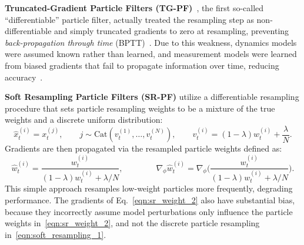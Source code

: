         \textbf{Truncated-Gradient Particle Filters (TG-PF)}~\cite{jonschkowski18_differentiable_particle_filter}, the first so-called ``differentiable'' particle filter, actually treated the resampling step as non-differentiable and simply truncated gradients to zero at resampling, preventing \emph{back-propagation through time} (BPTT)~\cite{werbos1990backpropagation}. Due to this weakness, dynamics models were assumed known rather than learned, and measurement models were learned from biased gradients that fail to propagate information over time, reducing accuracy~\cite{younis2023mdpf}.

        \textbf{Soft Resampling Particle Filters (SR-PF)} \cite{pmlr-v87-karkus18a_soft_resampling} utilize a differentiable resampling procedure that sets particle resampling weights to be a mixture of the true weights and a discrete uniform distribution:
        \begin{equation}
             \hat{x}_t^{(i)} = x_t^{(j)},  \qquad j \sim \text{Cat}(v_t^{(1)},\ldots,v_t^{(N)}), \qquad v_t^{(i)} = (1-\lambda)w_t^{(i)} + \frac{\lambda}{N}.
            \label{eqn:soft_resampling_1}
        \end{equation}	
        Gradients are then propagated via the resampled particle weights defined as:
        \begin{equation}
                 \hat{w}_t^{(i)} = \frac{w_t^{(i)}}{(1-\lambda)w_t^{(i)} + \lambda/N}, 
                 \qquad\qquad \nabla_{\phi}\hat{w}_t^{(i)} = \nabla_{\phi}\Bigg(\frac{w_t^{(i)}}{(1-\lambda)w_t^{(i)} + \lambda/N}\Bigg).
                \label{eqn:sr_weight_2}
        \end{equation}
        This simple approach resamples low-weight particles more frequently, degrading performance.
        The gradients of Eq.~\eqref{eqn:sr_weight_2} also have substantial bias, because they incorrectly assume model perturbations only influence the particle weights in~\eqref{eqn:sr_weight_2}, and not the discrete particle resampling in~\eqref{eqn:soft_resampling_1}.


